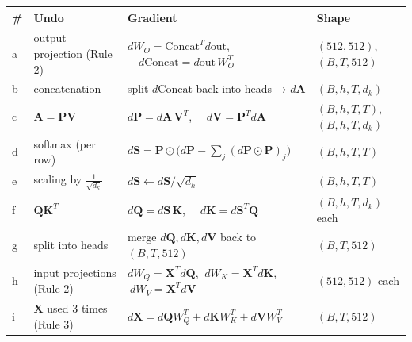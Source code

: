 \documentclass[11pt,a4paper,oneside]{report}
\begin{document}
{\def\LTcaptype{none} %
\begin{longtable}[]{@{}>{\raggedright\arraybackslash}p{}>{\raggedright\arraybackslash}p{}>{\raggedright\arraybackslash}p{}>{\raggedright\arraybackslash}p{}@{}}
\toprule\noalign{}
\# & Undo & Gradient & Shape \\
\midrule\noalign{}
\endhead
\bottomrule\noalign{}
\endlastfoot
a & output projection (Rule 2) & \(dW_O = \text{Concat}^T d\text{out}\), \(\quad d\text{Concat} = d\text{out}\,\allowbreak W_O^T\) & \((512,\allowbreak 512)\), \((B,\allowbreak T,\allowbreak 512)\) \\
b & concatenation & split \(d\text{Concat}\) back into heads → \(d\mathbf{A}\) & \((B,\allowbreak h,\allowbreak T,\allowbreak d_k)\) \\
c & \(\mathbf{A} = \mathbf{P}\mathbf{V}\) & \(d\mathbf{P} = d\mathbf{A}\,\allowbreak \mathbf{V}^T\), \(\quad d\mathbf{V} = \mathbf{P}^T d\mathbf{A}\) & \((B,\allowbreak h,\allowbreak T,\allowbreak T)\), \((B,\allowbreak h,\allowbreak T,\allowbreak d_k)\) \\
d & softmax (per row) & \(d\mathbf{S} = \mathbf{P} \odot \big(d\mathbf{P} - \textstyle\sum_j (d\mathbf{P} \odot \mathbf{P})_j\big)\) & \((B,\allowbreak h,\allowbreak T,\allowbreak T)\) \\
e & scaling by \(\frac{1}{\sqrt{d_k}}\) & \(d\mathbf{S} \leftarrow d\mathbf{S} / \sqrt{d_k}\) & \((B,\allowbreak h,\allowbreak T,\allowbreak T)\) \\
f & \(\mathbf{Q}\mathbf{K}^T\) & \(d\mathbf{Q} = d\mathbf{S}\,\allowbreak \mathbf{K}\), \(\quad d\mathbf{K} = d\mathbf{S}^T \mathbf{Q}\) & \((B,\allowbreak h,\allowbreak T,\allowbreak d_k)\) each \\
g & split into heads & merge \(d\mathbf{Q},\allowbreak d\mathbf{K},\allowbreak d\mathbf{V}\) back to \((B,\allowbreak T,\allowbreak 512)\) & \((B,\allowbreak T,\allowbreak 512)\) \\
h & input projections (Rule 2) & \(dW_Q = \mathbf{X}^T d\mathbf{Q}\), \(\ dW_K = \mathbf{X}^T d\mathbf{K}\), \(\ dW_V = \mathbf{X}^T d\mathbf{V}\) & \((512,\allowbreak 512)\) each \\
i & \(\mathbf{X}\) used 3 times (Rule 3) & \(d\mathbf{X} = d\mathbf{Q} W_Q^T + d\mathbf{K} W_K^T + d\mathbf{V} W_V^T\) & \((B,\allowbreak T,\allowbreak 512)\) \\
\end{longtable}
}
\end{document}
